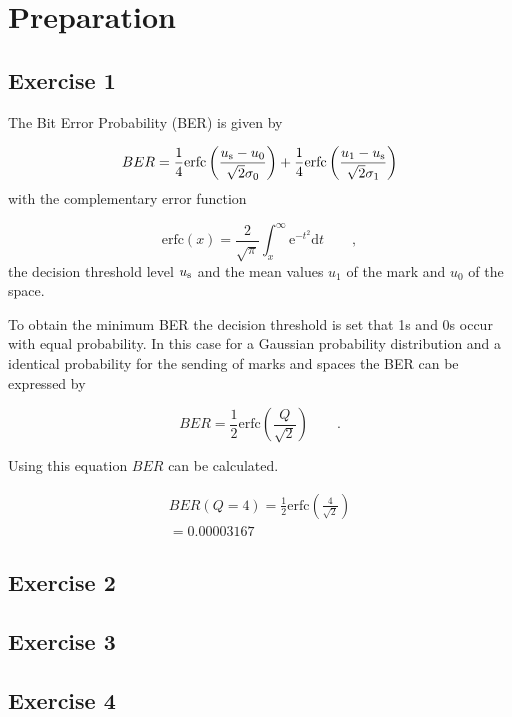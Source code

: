 \chapter{Preparation}


\section{Exercise 1}
The Bit Error Probability (BER) is given by

\begin{equation}
BER = \frac{1}{4}\mathrm{erfc}\left(\frac{u_{\mathrm{s}}-u_0}{\sqrt{2}\sigma_0}\right)+\frac{1}{4}\mathrm{erfc}\left(\frac{u_{\mathrm{1}}-u_{\mathrm{s}}}{\sqrt{2}\sigma_1}\right)
\label{eq:}
\end{equation}
with the complementary error function

\begin{equation}
\mathrm{erfc}(x)=\frac{2}{\sqrt{\pi}}\int^{\infty}_x\mathrm{e}^{-t^2}\mathrm{d}t\qquad,
\label{eq:}
\end{equation}
the decision threshold level $u_{\mathrm{s}}$ and the mean values $u_1$ of the mark and $u_0$ of the space.

To obtain the minimum BER the decision threshold is set that 1s and 0s occur with equal probability. In this case for a Gaussian probability distribution and a identical probability for the sending of marks and spaces the BER can be expressed by

\begin{equation}
BER = \frac{1}{2}\mathrm{erfc}\left(\frac{Q}{\sqrt{2}}\right)\qquad.
\label{eq:p1_BER}
\end{equation}

Using this equation $BER$ can be calculated.

\begin{equation}
\begin{split}
BER(Q=4) = \frac{1}{2}\mathrm{erfc}\left(\frac{4}{\sqrt{2}}\right)\\
=0.00003167
\end{split}
\label{eq:}
\end{equation}

\section{Exercise 2}




\section{Exercise 3}



\section{Exercise 4}